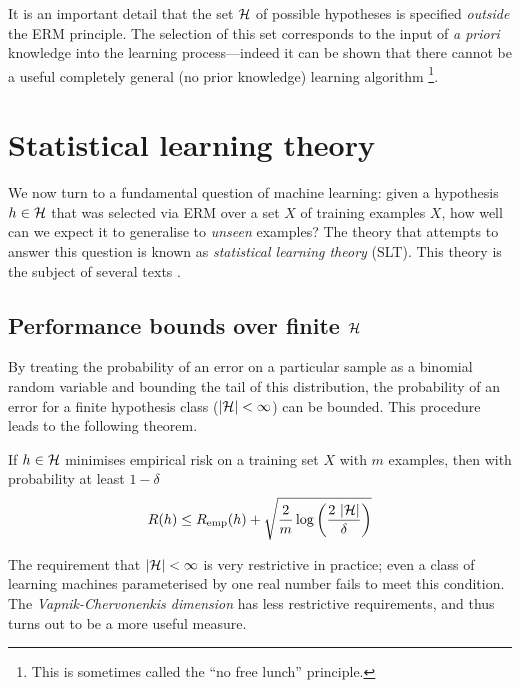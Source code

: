 It is an important detail that the set $\mathcal{H}$ of possible hypotheses
is specified \emph{outside} the ERM principle.  The selection of this
set corresponds to the input of \emph{a priori} knowledge into the
learning process---indeed it can be shown that there cannot be a
useful completely general (no prior knowledge) learning algorithm%
\footnote{This is sometimes called the ``no free lunch''
principle.}. 


\section{Statistical learning theory}
\label{sec:slt}
\label{acr:slt}

We now turn to a fundamental question of machine learning: given a
hypothesis $h \in \mathcal{H}$ that was selected via ERM over a set $X$ of
training examples $X$, how well can we expect it to generalise to 
\emph{unseen} examples?  The theory that attempts to answer this
question is known as \emph{statistical learning theory} (SLT).  This
theory is the subject of several texts \cite{Vapnik98, Cherkassky98,
Bartlett98a}. 

\subsection{Performance bounds over finite $\mathcal{H}$}

By treating the probability of an error on a particular sample as a
binomial random variable and bounding the tail of this distribution,
the probability of an error for a finite hypothesis class ($|\mathcal{H}| <
\infty$) can be bounded.  This procedure leads to the following theorem.

\begin{theorem}
If $h \in \mathcal{H}$ minimises empirical risk on a training set $X$
with $m$ examples, then with probability at least $1 - \delta$
%
\begin{equation}
R(h) \leq R_{\mathrm{emp}}(h) + \sqrt{\frac{2}{m}
\log \left( \frac{2\  |\mathcal{H}|}{\delta} \right)}
\end{equation}
\end{theorem}

The requirement that $|\mathcal{H}| < \infty$ is very restrictive in
practice; even a class of learning machines parameterised by one real
number fails to meet this condition.  The \emph{Vapnik-Chervonenkis
dimension} has less restrictive requirements, and thus turns out to be
a more useful measure.

